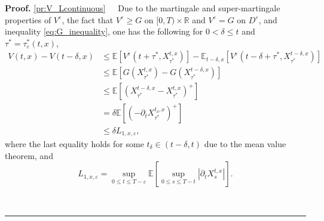 \documentclass{tufte-handout}
\newcommand{\E}{\mathbb{E}} %
\newcommand{\R}{\mathbb{R}} %
\newenvironment{pf}[1][Proof]{\textbf{#1.} }{\ \rule{0.5em}{0.5em}}
\begin{document}
	\begin{pf}
		\ref{pr:V_Lcontinuous}\ \ \ Due to the martingale and super-martingale properties of $V^\varepsilon$, the fact that $V^\varepsilon \geq G$ on $[0, T)\times\R$ and $V^\varepsilon = G$ on $D^\varepsilon$, and inequality \eqref{eq:G_inequality}, one has the following for $0 < \delta \leq t$ and $\tau^* = \tau_\varepsilon^*(t, x)$, 
		\begin{align}
		V(t, x) - V(t - \delta, x) &\leq \E\left[V^\varepsilon(t + \tau^*, X_{\tau^*}^{t, x})\right] - \E_{t - \delta, x}\left[V^\varepsilon(t - \delta + \tau^*, X_{\tau^*}^{t - \delta, x})\right] \nonumber \\
		&\leq \E\left[G\left(X_{\tau^*}^{t, x}\right) - G\left(X_{\tau^*}^{t - \delta, x}\right)\right] \nonumber \\
		&\leq \E\left[\left(X_{\tau^*}^{t - \delta, x} - X_{\tau^*}^{t, x}\right)^+\right] \nonumber \\
		&= \delta\E\left[\left(-\partial_tX_{\tau^*}^{t_\delta, x}\right)^+\right] \label{eq:V^epst-V^epst-delta<} \\
		&\leq \delta L_{1, x, \varepsilon}, \nonumber
		\end{align}
		where the last equality holds for some $t_\delta\in(t - \delta, t)$ due to the mean value theorem, and
		$$
		L_{1, x, \varepsilon} = \sup_{0\leq t \leq T - \varepsilon}\E\left[\sup_{0\leq s \leq T - t}|\partial_tX_s^{t, x}|\right].
		$$
		

\end{pf}
\end{document}
